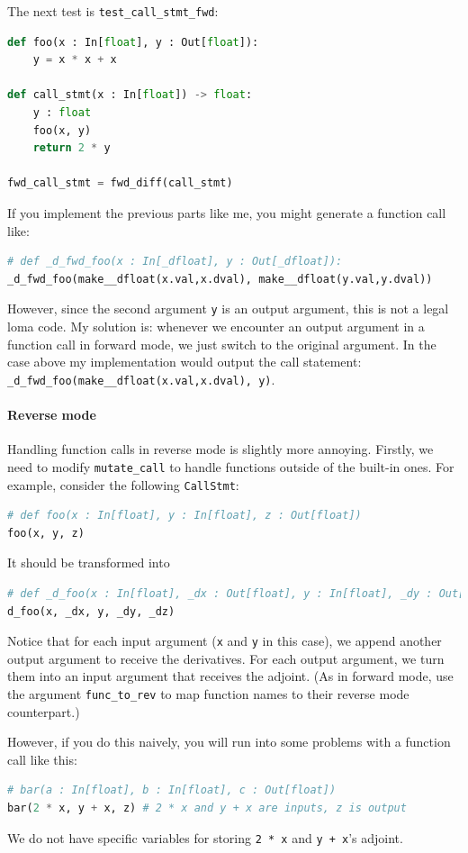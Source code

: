 The next test is \lstinline{test_call_stmt_fwd}:
\begin{lstlisting}[language=Python]
def foo(x : In[float], y : Out[float]):
    y = x * x + x

def call_stmt(x : In[float]) -> float:
    y : float
    foo(x, y)
    return 2 * y

fwd_call_stmt = fwd_diff(call_stmt)
\end{lstlisting}
If you implement the previous parts like me, you might generate a function call like:
\begin{lstlisting}[language=Python]
# def _d_fwd_foo(x : In[_dfloat], y : Out[_dfloat]):
_d_fwd_foo(make__dfloat(x.val,x.dval), make__dfloat(y.val,y.dval))
\end{lstlisting}
However, since the second argument \lstinline{y} is an output argument, this is not a legal loma code. My solution is: whenever we encounter an output argument in a function call in forward mode, we just switch to the original argument. In the case above my implementation would output the call statement: \lstinline{_d_fwd_foo(make__dfloat(x.val,x.dval), y)}.

\paragraph{Reverse mode} Handling function calls in reverse mode is slightly more annoying. Firstly, we need to modify \lstinline{mutate_call} to handle functions outside of the built-in ones. For example, consider the following \lstinline{CallStmt}:
\begin{lstlisting}[language=Python]
# def foo(x : In[float], y : In[float], z : Out[float])
foo(x, y, z)
\end{lstlisting}
It should be transformed into
\begin{lstlisting}[language=Python]
# def _d_foo(x : In[float], _dx : Out[float], y : In[float], _dy : Out[float], _dz : In[float])
d_foo(x, _dx, y, _dy, _dz)
\end{lstlisting}
Notice that for each input argument (\lstinline{x} and \lstinline{y} in this case), we append another output argument to receive the derivatives. For each output argument, we turn them into an input argument that receives the adjoint.
(As in forward mode, use the argument \lstinline{func_to_rev} to map function names to their reverse mode counterpart.)

However, if you do this naively, you will run into some problems with a function call like this:
\begin{lstlisting}[language=Python]
# bar(a : In[float], b : In[float], c : Out[float])
bar(2 * x, y + x, z) # 2 * x and y + x are inputs, z is output
\end{lstlisting}
We do not have specific variables for storing \lstinline{2 * x} and \lstinline{y + x}'s adjoint. 

